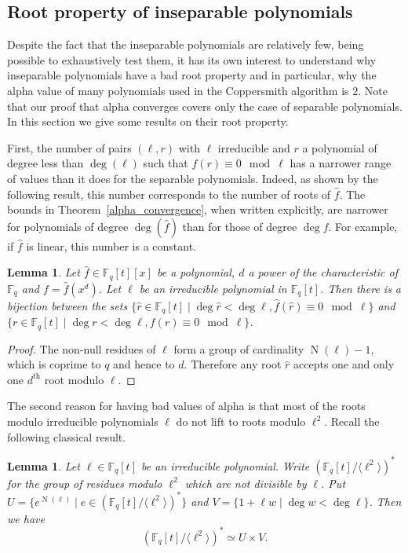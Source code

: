 \documentclass[a4wide]{article}
\newcommand{\F}{{\mathbb F}}
\DeclareMathOperator{\Norm}{N}
\theoremstyle{plain}
\newtheorem{lem}[theo]{Lemma}
\theoremstyle{definition}
\theoremstyle{remark}
\begin{document}
\subsection{Root property of inseparable polynomials}
\label{inseparable}
Despite the fact that the inseparable polynomials are relatively few, being
possible to exhaustively test them, it has its own interest to understand why
inseparable polynomials have a bad root property and in particular, why the
alpha value of many polynomials used in the Coppersmith algorithm is $2$.
Note that our proof that alpha converges covers only the case of separable
polynomials. In this section we give some results on their root property.  

First, the number of pairs $(\ell,r)$ with $\ell$ irreducible and $r$ a
polynomial
of degree less than $\deg(\ell)$ such that $f(r)\equiv 0\mod \ell$ has a
narrower range of values than it does for the separable polynomials. Indeed, as shown by the following result, this number
corresponds to the number of roots of $\hat{f}$. The bounds in Theorem~\ref{alpha_convergence}, when written explicitly, are narrower for polynomials of
degree $\deg(\hat{f})$ than for those of degree $\deg f$. For example, if
$\hat{f}$ is linear, this number is a constant.
\begin{lem} \label{lem:hat}Let $\hat{f}\in\F_q[t][x]$ be a polynomial, $d$ a power of the
	characteristic of $\F_q$ and $f=\hat{f}(x^d)$. Let $\ell$ be an
	irreducible polynomial in $\F_q[t]$. Then there is a
bijection between the sets $\{\hat{r}\in\F_q[t]\mid \deg
\hat{r}<\deg \ell, \hat{f}(\hat{r})\equiv 0\mod \ell\}$ and
	$\{r\in\F_q[t]\mid \deg r< \deg\ell, f(r)\equiv 0\mod \ell\}$. 
\end{lem}
\begin{proof}
	The non-null residues of $\ell$ form a group of cardinality
	$\Norm(\ell)-1$, which is coprime to $q$ and hence to $d$. Therefore
any root $\hat{r}$ accepts one and only one $d^\text{th}$ root modulo
	$\ell$. 
\end{proof}
The second reason for having bad values of alpha is that most of the roots
modulo irreducible polynomials $\ell$ do not lift to roots modulo $\ell^2$.
Recall the following classical result.
\begin{lem} Let $\ell\in\F_q[t]$ be an irreducible polynomial. Write
	$(\F_q[t]/\langle\ell^2\rangle)^*$ for the group of residues modulo
	$\ell^2$ which are not divisible by $\ell$. Put
	$U=\{e^{\Norm(\ell)}\mid e \in (\F_q[t]/\langle\ell^2\rangle)^*\}$
	and $V=\{1+\ell w\mid \deg w<\deg
	\ell\}$. Then we have 
	\begin{equation*}
		(\F_q[t]/\langle\ell^2\rangle)^*\simeq U\times V.
	\end{equation*}
\end{lem}
\end{document}
